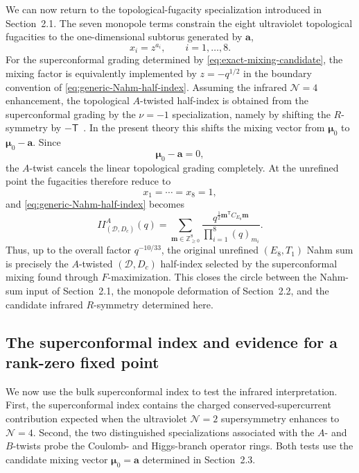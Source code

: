 \documentclass[11pt,a4paper]{article}
\numberwithin{equation}{section}
\begin{document}
We can now return to the topological-fugacity specialization introduced in Section~2.1.  The seven monopole terms constrain the eight ultraviolet topological fugacities to the one-dimensional subtorus generated by $\boldsymbol a$,
\begin{equation}
  x_i=z^{a_i},
  \qquad i=1,\ldots,8.
  \label{eq:topological-subtorus}
\end{equation}
For the superconformal grading determined by \eqref{eq:exact-mixing-candidate}, the mixing factor is equivalently implemented by $z=-q^{1/2}$ in the boundary convention of \eqref{eq:generic-Nahm-half-index}.  Assuming the infrared $\mathcal N=4$ enhancement, the topological $A$-twisted half-index is obtained from the superconformal grading by the $\nu=-1$ specialization, namely by shifting the $R$-symmetry by $-\mathsf T$~\cite{GangKimParkStubbs:2024Nahm}.  In the present theory this shifts the mixing vector from $\boldsymbol\mu_0$ to $\boldsymbol\mu_0-\boldsymbol a$.  Since
\begin{equation}
  \boldsymbol\mu_0-\boldsymbol a=0,
  \label{eq:A-twist-cancellation}
\end{equation}
the $A$-twist cancels the linear topological grading completely.  At the unrefined point the fugacities therefore reduce to
\begin{equation}
  x_1=\cdots=x_8=1,
  \label{eq:A-twist-fugacity-one}
\end{equation}
and \eqref{eq:generic-Nahm-half-index} becomes
\begin{equation}
  I\!\!I_{(\mathcal D,D_c)}^{A}(q)
  =\sum_{\boldsymbol m\in\mathbb Z_{\geq0}^{8}}
  \frac{q^{\frac12\boldsymbol m^{\mathsf T}C_{E_8}\boldsymbol m}}
  {\prod_{i=1}^{8}(q)_{m_i}}.
  \label{eq:A-twisted-vacuum-half-index}
\end{equation}
Thus, up to the overall factor $q^{-10/33}$, the original unrefined $(E_8,T_1)$ Nahm sum is precisely the $A$-twisted $(\mathcal D,D_c)$ half-index selected by the superconformal mixing found through $F$-maximization.  This closes the circle between the Nahm-sum input of Section~2.1, the monopole deformation of Section~2.2, and the candidate infrared $R$-symmetry determined here.


\subsection{The superconformal index and evidence for a rank-zero fixed point}
\label{subsec:SCI-rank-zero}

We now use the bulk superconformal index to test the infrared interpretation.  First, the superconformal index contains the charged conserved-supercurrent contribution expected when the ultraviolet $\mathcal N=2$ supersymmetry enhances to $\mathcal N=4$.  Second, the two distinguished specializations associated with the $A$- and $B$-twists probe the Coulomb- and Higgs-branch operator rings.  Both tests use the candidate mixing vector $\boldsymbol\mu_0=\boldsymbol a$ determined in Section~2.3.
\end{document}

